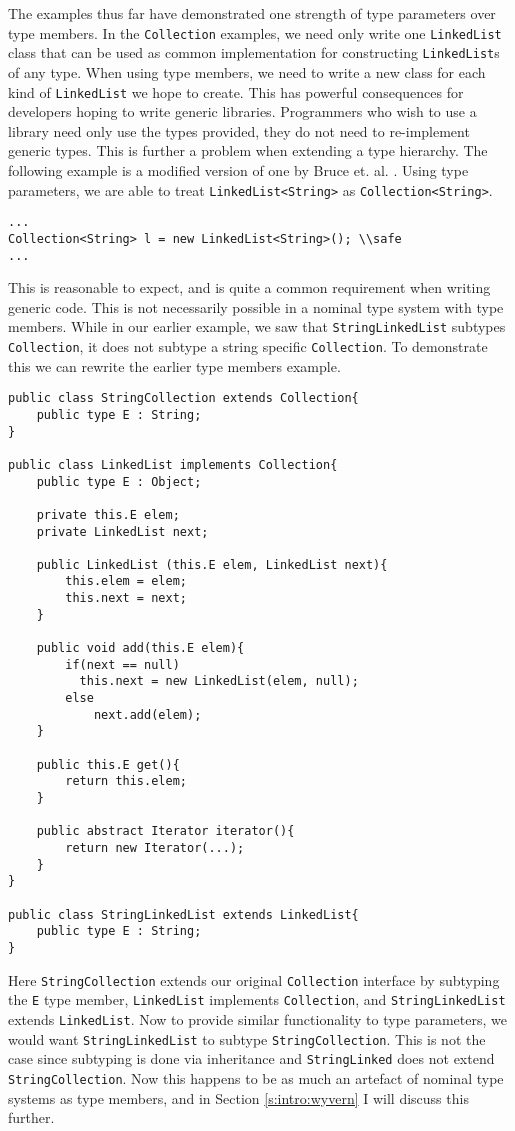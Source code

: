 \documentclass[11pt
              , a4paper
              , twoside
              , openright
              ]{report}
\numberwithin{case}{theorem}
\numberwithin{subcase}{case}
\begin{document}
The examples thus far have demonstrated one strength of type parameters over type members. In the \verb|Collection| examples, we need only write one \verb|LinkedList| class that can be used as common implementation for constructing \verb|LinkedList|s of any type. When using type members, we need to write a new class for each kind of \verb|LinkedList| we hope to create. This has powerful consequences for developers hoping to write generic libraries. Programmers who wish to use a library need only use the types provided, they do not need to re-implement generic types. This is further a problem when extending a type hierarchy. The following example is a modified version of one by Bruce et. al. \cite{Bruce:1998:SSA:646155.679691}. Using type parameters, we are able to treat \verb|LinkedList<String>| as \verb|Collection<String>|.
\begin{lstlisting}[mathescape, style=custom_lang]
...
Collection<String> l = new LinkedList<String>(); \\safe
...
\end{lstlisting}
This is reasonable to expect, and is quite a common requirement when writing generic code. This is not necessarily possible in a nominal type system with type members. While in our earlier example, we saw that \verb|StringLinkedList| subtypes \verb|Collection|, it does not subtype a string specific \verb|Collection|. To demonstrate this we can rewrite the earlier type members example.
\begin{lstlisting}[mathescape, style=custom_lang]
public class StringCollection extends Collection{
	public type E : String;
}

public class LinkedList implements Collection{
	public type E : Object;

	private this.E elem;
	private LinkedList next;
	
	public LinkedList (this.E elem, LinkedList next){
		this.elem = elem;
		this.next = next;
	}
	
	public void add(this.E elem){
		if(next == null)
		  this.next = new LinkedList(elem, null);
		else
			next.add(elem);
	}
	
	public this.E get(){
		return this.elem;
	}
	
	public abstract Iterator iterator(){
		return new Iterator(...);
	}
}

public class StringLinkedList extends LinkedList{
	public type E : String;
}
\end{lstlisting}
Here \verb|StringCollection| extends our original \verb|Collection| interface by subtyping the \verb|E| type member, \verb|LinkedList| implements \verb|Collection|, and \verb|StringLinkedList| extends \verb|LinkedList|. Now to provide similar functionality to type parameters, we would want \verb|StringLinkedList| to subtype \verb|StringCollection|. This is not the case since subtyping is done via inheritance and \verb|StringLinked| does not extend \verb|StringCollection|. Now this happens to be as much an artefact of nominal type systems as type members, and in Section \ref{s:intro:wyvern} I will discuss this further.
\end{document}
